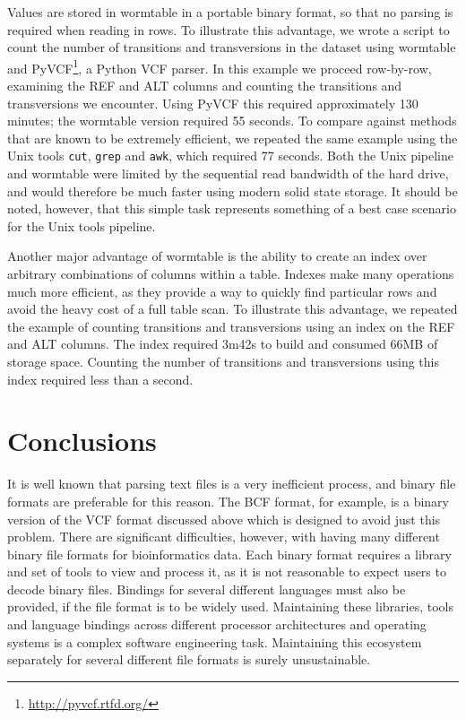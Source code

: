 \documentclass{bioinfo}
\begin{document}
Values are stored in wormtable in a portable binary format, so that no parsing is
required when reading in rows. To illustrate this advantage, we
wrote a script to count the number of transitions and transversions
in the dataset using wormtable and PyVCF\footnote{%
\href{http://pyvcf.rtfd.org/}{http://pyvcf.rtfd.org/}}, 
a Python VCF parser.
In this example we proceed 
row-by-row, examining the REF and ALT columns and
counting the transitions and transversions we encounter. 
Using PyVCF this required approximately 130 minutes;
the wormtable version required
55 seconds. To compare against methods that are known to be extremely
efficient, we repeated the same 
example using the Unix tools \texttt{cut}, \texttt{grep} 
and \texttt{awk},  which required 77 seconds. Both the
Unix pipeline and wormtable were limited by the sequential read
bandwidth of the hard drive, and would therefore be much 
faster using modern solid state storage.
It should be noted, however, that this simple task represents 
something of a best case scenario for the Unix tools pipeline.

Another major advantage of wormtable is the ability to create 
an index over arbitrary combinations of columns within a table.
Indexes make many operations much more efficient, as they provide 
a way to quickly find particular rows and avoid the 
heavy cost of a full table scan.
To illustrate this advantage, we repeated the example 
of counting transitions and transversions using an index 
on the REF and ALT columns.
The index required 3m42s to build and 
consumed 66MB of storage space. Counting the number of 
transitions and transversions using this index required 
less than a second.

\section{Conclusions}
It is well known that parsing text files is a very inefficient process, 
and binary file formats are preferable for this reason. The BCF format,
for example, is a binary version of the VCF format discussed above which 
is designed to avoid just this problem. There are significant difficulties,
however, with having many different binary file formats for bioinformatics 
data. Each binary format requires a library and set of tools to view 
and process it, as it is not reasonable to expect users to decode binary
files. Bindings for several different languages must also be provided, if 
the file format is to be widely used.
Maintaining these libraries, tools and language bindings across 
different processor architectures and operating systems
is a complex software engineering task. Maintaining this ecosystem 
separately for several different file formats is surely 
unsustainable.
\end{document}
